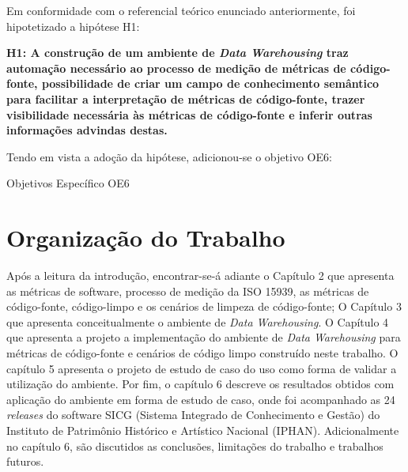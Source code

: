 Em conformidade com o referencial teórico enunciado anteriormente, foi hipotetizado a hipótese H1:

\textbf{H1: A construção de um ambiente de \textit{Data Warehousing} traz automação necessário ao processo de medição de métricas de código-fonte, possibilidade de criar um campo de conhecimento semântico para facilitar a interpretação de métricas de código-fonte, trazer visibilidade necessária às métricas de código-fonte e inferir outras informações advindas destas.} 

Tendo em vista a adoção da hipótese, adicionou-se o objetivo OE6:
\begin{table}[H]
\centering

\caption{Objetivos Específico OE6}
\label{tbl:obj} 
\end{table}
\FloatBarrier


\section{Organização do Trabalho}

Após a leitura da introdução, encontrar-se-á adiante o Capítulo 2 que apresenta as 
métricas de software, processo de medição da ISO 15939, 
as métricas de código-fonte, código-limpo e os cenários de limpeza de código-fonte; O Capítulo 3 que apresenta conceitualmente o ambiente de \textit{Data Warehousing}. O Capítulo 4 que apresenta a projeto  a implementação do ambiente de \textit{Data Warehousing} para métricas de código-fonte e cenários de código limpo construído neste trabalho. O capítulo 5 apresenta o projeto de estudo de caso do uso como forma de validar a utilização do ambiente. Por fim, o capítulo 6 descreve os resultados obtidos com aplicação do ambiente em forma de estudo de caso, onde foi acompanhado as 24 \textit{releases} do software SICG (Sistema Integrado de Conhecimento e Gestão) do Instituto de Patrimônio Histórico e Artístico Nacional (IPHAN). Adicionalmente no capítulo 6, são discutidos as conclusões, limitações do trabalho e trabalhos futuros.   